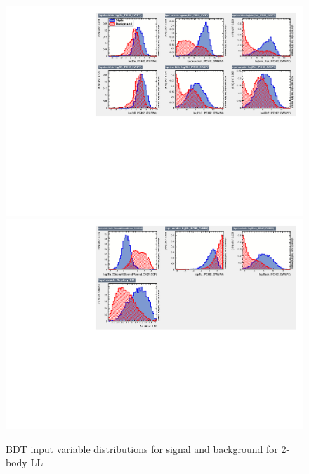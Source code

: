 
\begin{figure}[tb]
\includegraphics[width=\linewidth]{figures/selection/inputvariables_KPi_LL_run1_1.pdf}
\includegraphics[width=\linewidth]{figures/selection/inputvariables_KPi_LL_run1_2.pdf}
\caption{BDT input variable distributions for signal and background for 2-body LL}
\label{BDTinputdist2bodyLL}
\end{figure}

